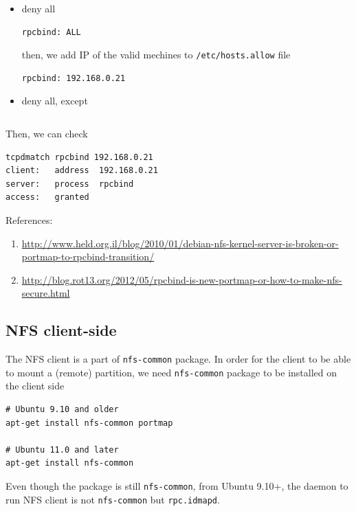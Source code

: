\begin{itemize}
  \item deny all
  
\begin{verbatim}
rpcbind: ALL
\end{verbatim}

then, we add IP of the valid mechines to \verb!/etc/hosts.allow! file

\begin{verbatim}
rpcbind: 192.168.0.21
\end{verbatim}
  
  \item deny all, except

\begin{verbatim}

\end{verbatim}

\end{itemize}


Then, we can check
\begin{verbatim}
tcpdmatch rpcbind 192.168.0.21
client:   address  192.168.0.21
server:   process  rpcbind
access:   granted
\end{verbatim}


References:
\begin{enumerate}
  \item
  \url{http://www.held.org.il/blog/2010/01/debian-nfs-kernel-server-is-broken-or-portmap-to-rpcbind-transition/}
  \item
  \url{http://blog.rot13.org/2012/05/rpcbind-is-new-portmap-or-how-to-make-nfs-secure.html}
\end{enumerate}


\subsection{NFS client-side}
\label{sec:NFS_client}

The NFS client is a part of \verb!nfs-common! package. In order for the client
to be able to mount a (remote) partition, we need \verb!nfs-common! package to
be installed on the client side
\begin{verbatim}
# Ubuntu 9.10 and older
apt-get install nfs-common portmap

# Ubuntu 11.0 and later
apt-get install nfs-common 
\end{verbatim}

\begin{mdframed}

Even though the package is still \verb!nfs-common!, from Ubuntu
9.10+, the daemon to run NFS client is not \verb!nfs-common! but
\verb!rpc.idmapd!. 
\end{mdframed}

